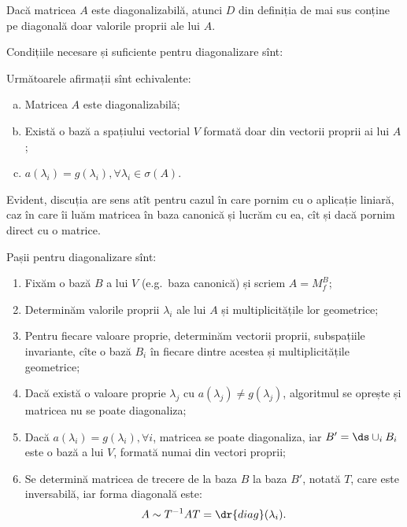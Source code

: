\begin{remark}\label{rk:diag}
  Dacă matricea $ A $ este diagonalizabilă, atunci $ D $ din definiția de mai sus
  conține pe diagonală doar valorile proprii ale lui $ A $.
\end{remark}

Condițiile necesare și suficiente pentru diagonalizare sînt:
\begin{theorem}\label{thm:diag}
  Următoarele afirmații sînt echivalente:
  \begin{enumerate}[(a)]
  \item Matricea $ A $ este diagonalizabilă;
  \item Există o bază a spațiului vectorial $ V $ formată doar din vectorii
    proprii ai lui $ A $;
  \item $ a(\lambda_i) = g(\lambda_i), \forall \lambda_i \in \sigma(A) $.
  \end{enumerate}
\end{theorem}

Evident, discuția are sens atît pentru cazul în care pornim cu o aplicație
liniară, caz în care îi luăm matricea în baza canonică și lucrăm cu ea,
cît și dacă pornim direct cu o matrice.

Pașii pentru diagonalizare sînt:
\begin{enumerate}[(1)]
\item Fixăm o bază $ B $ a lui $ V $ (e.g.\ baza canonică) și scriem $ A = M_f^B $;
\item Determinăm valorile proprii $ \lambda_i $ ale lui $ A $ și multiplicitățile
  lor geometrice;
\item Pentru fiecare valoare proprie, determinăm vectorii proprii, subspațiile
  invariante, cîte o bază $ B_i $ în fiecare dintre acestea și multiplicitățile
  geometrice;
\item Dacă există o valoare proprie $ \lambda_j $ cu $ a(\lambda_j) \neq g(\lambda_j)$,
  algoritmul se oprește și matricea nu se poate diagonaliza;
\item Dacă $ a(\lambda_i) = g(\lambda_i), \forall i $, matricea se poate
  diagonaliza, iar $ B' = \ds\cup_i B_i $ este o bază a lui $ V $, formată
  numai din vectori proprii;
\item Se determină matricea de trecere de la baza $ B $ la baza $ B' $, notată $ T $,
  care este inversabilă, iar forma diagonală este:
  \begin{equation}
    \label{eq:diag}
    A \sim T^{-1} AT = \dr{diag} (\lambda_i).
  \end{equation}
\end{enumerate}

